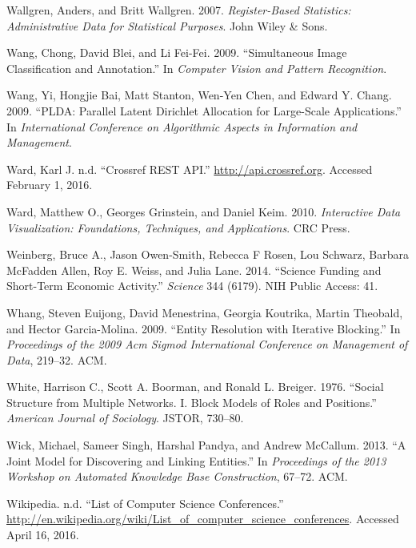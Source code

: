 \documentclass[]{krantz}
\begin{document}
\hypertarget{ref-wallgren2007register}{}
Wallgren, Anders, and Britt Wallgren. 2007. \emph{Register-Based
Statistics: Administrative Data for Statistical Purposes}. John Wiley \&
Sons.

\hypertarget{ref-wang-09b}{}
Wang, Chong, David Blei, and Li Fei-Fei. 2009. ``Simultaneous Image
Classification and Annotation.'' In \emph{Computer Vision and Pattern
Recognition}.

\hypertarget{ref-wang-09}{}
Wang, Yi, Hongjie Bai, Matt Stanton, Wen-Yen Chen, and Edward Y. Chang.
2009. ``PLDA: Parallel Latent Dirichlet Allocation for Large-Scale
Applications.'' In \emph{International Conference on Algorithmic Aspects
in Information and Management}.

\hypertarget{ref-crossref}{}
Ward, Karl J. n.d. ``Crossref REST API.'' \url{http://api.crossref.org}.
Accessed February 1, 2016.

\hypertarget{ref-ward2010interactive}{}
Ward, Matthew O., Georges Grinstein, and Daniel Keim. 2010.
\emph{Interactive Data Visualization: Foundations, Techniques, and
Applications}. CRC Press.

\hypertarget{ref-weinberg2014science}{}
Weinberg, Bruce A., Jason Owen-Smith, Rebecca F Rosen, Lou Schwarz,
Barbara McFadden Allen, Roy E. Weiss, and Julia Lane. 2014. ``Science
Funding and Short-Term Economic Activity.'' \emph{Science} 344 (6179).
NIH Public Access: 41.

\hypertarget{ref-whang2009entity}{}
Whang, Steven Euijong, David Menestrina, Georgia Koutrika, Martin
Theobald, and Hector Garcia-Molina. 2009. ``Entity Resolution with
Iterative Blocking.'' In \emph{Proceedings of the 2009 Acm Sigmod
International Conference on Management of Data}, 219--32. ACM.

\hypertarget{ref-white1976social}{}
White, Harrison C., Scott A. Boorman, and Ronald L. Breiger. 1976.
``Social Structure from Multiple Networks. I. Block Models of Roles and
Positions.'' \emph{American Journal of Sociology}. JSTOR, 730--80.

\hypertarget{ref-wick2013joint}{}
Wick, Michael, Sameer Singh, Harshal Pandya, and Andrew McCallum. 2013.
``A Joint Model for Discovering and Linking Entities.'' In
\emph{Proceedings of the 2013 Workshop on Automated Knowledge Base
Construction}, 67--72. ACM.

\hypertarget{ref-CSConf}{}
Wikipedia. n.d. ``List of Computer Science Conferences.''
\url{http://en.wikipedia.org/wiki/List_of_computer_science_conferences}.
Accessed April 16, 2016.
\end{document}

